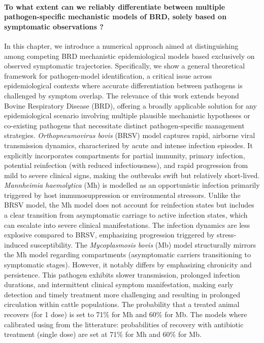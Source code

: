 \paragraph{To what extent can we reliably differentiate between multiple pathogen-specific mechanistic models of BRD, solely based on symptomatic observations ?} In this chapter, we introduce a numerical approach aimed at distinguishing among competing BRD mechanistic epidemiological models \cite{sorindupont_modeling_2023} based exclusively on observed symptomatic trajectories. Specifically, we show a general theoretical framework for pathogen-model identification, a critical issue across epidemiological contexts where accurate differentiation between pathogens is challenged by symptom overlap. The relevance of this work extends beyond Bovine Respiratory Disease (BRD), offering a broadly applicable solution for any epidemiological scenario involving multiple plausible mechanistic hypotheses or co-existing pathogens that necessitate distinct pathogen-specific management strategies. \textit{Orthopneumovirus bovis} (BRSV) model captures rapid, airborne viral transmission dynamics, characterized by acute and intense infection episodes. It explicitly incorporates compartments for partial immunity, primary infection, potential reinfection (with reduced infectiousness), and rapid progression from mild to severe clinical signs, making the outbreaks swift but relatively short-lived. \textit{Mannheimia haemolytica} (Mh) is modelled as an opportunistic infection primarily triggered by host immunosuppression or environmental stressors. Unlike the BRSV model, the Mh model does not account for reinfection states but includes a clear transition from asymptomatic carriage to active infection states, which can escalate into severe clinical manifestations. The infection dynamics are less explosive compared to BRSV, emphasizing progression triggered by stress-induced susceptibility. The \textit{Mycoplasmosis bovis} (Mb) model structurally mirrors the Mh model regarding compartments (asymptomatic carriers transitioning to symptomatic stages). However, it notably differs by emphasizing chronicity and persistence. This pathogen exhibits slower transmission, prolonged infection durations, and intermittent clinical symptom manifestation, making early detection and timely treatment more challenging and resulting in prolonged circulation within cattle populations. The probability that a treated animal recovers (for 1 dose) is set to 71\% for  Mh and 60\% for Mb. The models where calibrated using from the litterature: probabilities of recovery with antibiotic treatment (single dose) are set at 71\% for Mh and 60\% for Mb.


